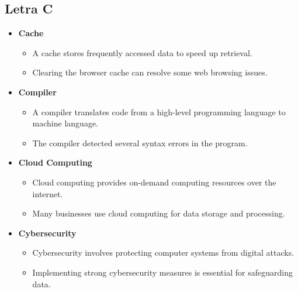    \subsection{Letra C}
    \begin{itemize}
        \item \textbf{Cache}
        \begin{itemize}
            \item A cache stores frequently accessed data to speed up retrieval.
            \item Clearing the browser cache can resolve some web browsing issues.
        \end{itemize}
        \item \textbf{Compiler}
        \begin{itemize}
            \item A compiler translates code from a high-level programming language to machine language.
            \item The compiler detected several syntax errors in the program.
        \end{itemize}
        \item \textbf{Cloud Computing}
        \begin{itemize}
            \item Cloud computing provides on-demand computing resources over the internet.
            \item Many businesses use cloud computing for data storage and processing.
        \end{itemize}
        \item \textbf{Cybersecurity}
        \begin{itemize}
            \item Cybersecurity involves protecting computer systems from digital attacks.
            \item Implementing strong cybersecurity measures is essential for safeguarding data.
        \end{itemize}
    \end{itemize}

